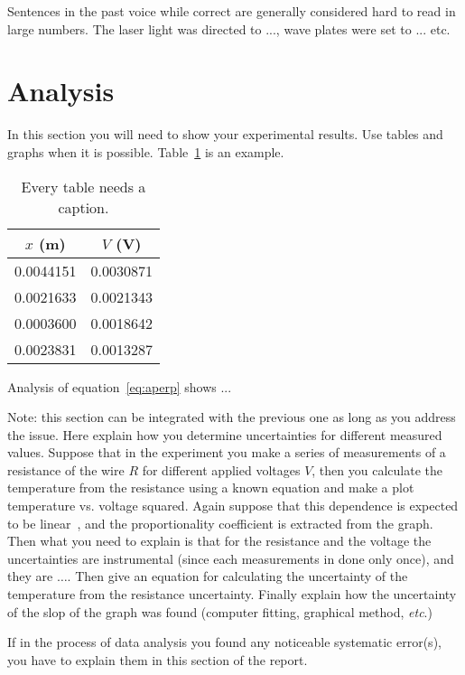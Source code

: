 \documentclass[letterpaper,12pt]{article}
\begin{document}
Sentences in the past voice while correct are generally considered hard to read
in large numbers. The laser light was directed to ..., wave plates were set
to ... etc.


\section{Analysis}

In this section you will need to show your experimental results. Use tables and
graphs when it is possible. Table~\ref{tbl:bins} is an example.

\begin{table}[ht]
\begin{center}
\caption{Every table needs a caption.}
\label{tbl:bins} %
\begin{tabular}{|cc|} 
\hline
\multicolumn{1}{|c}{$x$ (m)} & \multicolumn{1}{c|}{$V$ (V)} \\
\hline
0.0044151 &   0.0030871 \\
0.0021633 &   0.0021343 \\
0.0003600 &   0.0018642 \\
0.0023831 &   0.0013287 \\
\hline
\end{tabular}
\end{center}
\end{table}

Analysis of equation~\ref{eq:aperp} shows ...

Note: this section can be integrated with the previous one as long as you
address the issue. Here explain how you determine uncertainties for different
measured values. Suppose that in the experiment you make a series of
measurements of a resistance of the wire $R$ for different applied voltages
$V$, then you calculate the temperature from the resistance using a known
equation and make a plot  temperature vs. voltage squared. Again suppose that
this dependence is expected to be linear~\cite{Cyr}, and the proportionality coefficient
is extracted from the graph. Then what you need to explain is that for the
resistance and the voltage the uncertainties are instrumental (since each
measurements in done only once), and they are $\dots$. Then give an equation
for calculating the uncertainty of the temperature from the resistance
uncertainty. Finally explain how the uncertainty of the slop of the graph was
found (computer fitting, graphical method, \emph{etc}.)

If in the process of data analysis you found any noticeable systematic
error(s), you have to explain them in this section of the report.
\end{document}
